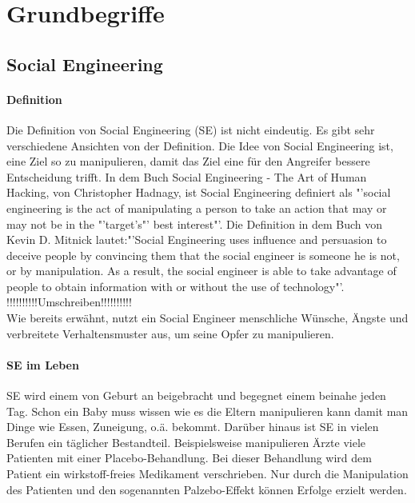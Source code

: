 
\chapter {Grundbegriffe}  %
\label{cha:grundlagen} %

\section{Social Engineering} %
\label {sec:Unterkapitel} %
\subsubsection{Definition}
Die Definition von Social Engineering (SE) ist nicht eindeutig. Es gibt sehr verschiedene Ansichten von der Definition. Die Idee von Social Engineering ist, eine Ziel so zu manipulieren, damit das Ziel eine für den Angreifer bessere Entscheidung trifft. In dem Buch Social Engineering - The Art of Human Hacking, von Christopher Hadnagy, ist Social Engineering definiert als "'social engineering is the act of manipulating a person to take an action that may or may not be in the "'target’s"' best interest"'\cite{ArtOfHumanHacking}. Die Definition in dem Buch von Kevin D. Mitnick lautet:"'Social Engineering uses influence and persuasion to deceive people by convincing them that the social engineer is someone he is not, or by manipulation. As a result, the social engineer is able to take advantage of people to obtain information with or without the use of technology"'\cite{ArtOfDeception}.\\
!!!!!!!!!!Umschreiben!!!!!!!!!!\\Wie bereits erwähnt, nutzt ein Social Engineer menschliche Wünsche, Ängste
und verbreitete Verhaltensmuster aus, um seine Opfer zu manipulieren.\cite{LeitfadenSE}\\

\subsubsection{SE im Leben}
SE wird einem von Geburt an beigebracht und begegnet einem beinahe jeden Tag. Schon ein Baby muss wissen wie es die Eltern manipulieren kann damit man Dinge wie Essen, Zuneigung, o.ä. bekommt. Darüber hinaus ist SE in vielen Berufen ein täglicher Bestandteil. Beispielsweise manipulieren Ärzte viele Patienten mit einer Placebo-Behandlung. Bei dieser Behandlung wird dem Patient ein wirkstoff-freies Medikament verschrieben. Nur durch die Manipulation des Patienten und den sogenannten Palzebo-Effekt können Erfolge erzielt werden.\\

